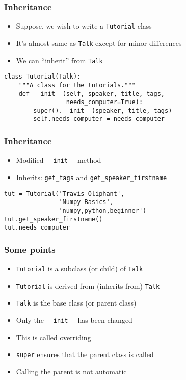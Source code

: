 \documentclass[14pt,compress,aspectratio=169]{beamer}
\begin{document}
\begin{frame}[fragile]
  \frametitle{Inheritance}
  \vspace*{-0.1in}
  \begin{itemize}
  \item Suppose, we wish to write a \lstinline{Tutorial} class
  \item It's almost same as \lstinline{Talk} except for minor differences
  \item We can ``inherit'' from \lstinline{Talk}
  \end{itemize}
  \pause
  \begin{lstlisting}
class Tutorial(Talk):
    """A class for the tutorials."""
    def __init__(self, speaker, title, tags,
                 needs_computer=True):
        super().__init__(speaker, title, tags)
        self.needs_computer = needs_computer
  \end{lstlisting}
\end{frame}

\begin{frame}[fragile]
  \frametitle{Inheritance}
  \vspace*{-0.1in}
  \begin{itemize}
  \item Modified \lstinline{__init__} method
  \item Inherits: \lstinline{get_tags} and
    \lstinline{get_speaker_firstname}
  \end{itemize}
  \begin{lstlisting}
tut = Tutorial('Travis Oliphant',
               'Numpy Basics',
               'numpy,python,beginner')
tut.get_speaker_firstname()
tut.needs_computer
  \end{lstlisting}
\end{frame}

\begin{frame}
  \frametitle{Some points}
  \begin{itemize}
  \item \lstinline{Tutorial} is a subclass (or child) of \lstinline{Talk}
  \item \lstinline{Tutorial} is derived from (inherits from) \lstinline{Talk}
  \item \lstinline{Talk} is the base class (or parent class)
  \item Only the \lstinline{__init__} has been changed
  \item This is called overriding
  \item \lstinline{super} ensures that the parent class is called
  \item Calling the parent is not automatic
  \end{itemize}
\end{frame}
\end{document}
